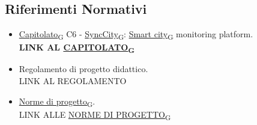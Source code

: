 \subsection{Riferimenti Normativi} %
\begin{itemize}
	\item \href{https://7last.github.io/docs/rtb/documentazione-interna/glossario\#capitolato}{Capitolato\textsubscript{G}} C6 - \href{https://7last.github.io/docs/rtb/documentazione-interna/glossario\#synccity}{SyncCity\textsubscript{G}}: \href{https://7last.github.io/docs/rtb/documentazione-interna/glossario\#smart-city}{Smart city\textsubscript{G}} monitoring platform.\\
	      \textbf{LINK AL \href{https://7last.github.io/docs/rtb/documentazione-interna/glossario\#capitolato}{CAPITOLATO\textsubscript{G}}}
	\item Regolamento di progetto didattico.\\
	      LINK AL REGOLAMENTO
	\item \href{https://7last.github.io/docs/rtb/documentazione-interna/glossario\#norme-di-progetto}{Norme di progetto\textsubscript{G}}.\\
	      LINK ALLE \href{https://7last.github.io/docs/rtb/documentazione-interna/glossario\#norme-di-progetto}{NORME DI PROGETTO\textsubscript{G}}
\end{itemize}







